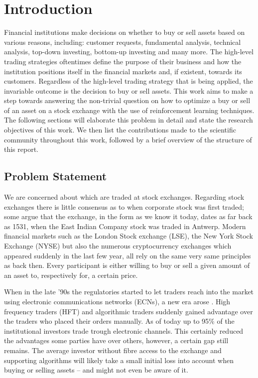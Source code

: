 \chapter{Introduction}

Financial institutions make decisions on whether to buy or sell assets based on various reasons, including: customer requests, fundamental analysis\cite{fundamental-analysis}, technical analysis\cite{technical-analysis}, top-down investing\cite{td-investing}, bottom-up investing\cite{bu-investing} and many more. 
The high-level trading strategies oftentimes define the purpose of their business and how the institution positions itself in the financial markets and, if existent, towards its customers. 
Regardless of the high-level trading strategy that is being applied, the invariable outcome is the decision to buy or sell assets.
This work aims to make a step towards answering the non-trivial question on how to optimize a buy or sell of an asset on a stock exchange with the use of reinforcement learning techniques.
The following sections will elaborate this problem in detail and state the research objectives of this work. 
We then list the contributions made to the scientific community throughout this work, followed by a brief overview of the structure of this report.

\section{Problem Statement}

We are concerned about which are traded at stock exchanges.
Regarding stock exchanges there is little consensus as to when corporate stock was first traded; some argue that the exchange, in the form as we know it today, dates as far back as 1531, when the East Indian Company stock was traded in Antwerp\cite{stock-exchange}.
Modern financial markets such as the London Stock exchange (LSE), the New York Stock Exchange (NYSE) but also the numerous cryptocurrency exchanges which appeared suddenly in the last few year, all rely on the same very same principles as back then.
Every participant is either willing to buy or sell a given amount of an asset to, respectively for, a certain price.

When in the late '90s the regulatories started to let traders reach into the market using electronic communications networks (ECNs), a new era arose \cite{dark-pools}.
High frequency traders (HFT) and algorithmic traders suddenly gained advantage over the traders who placed their orders manually.
As of today up to 95\% of the institutional investors trade trough electronic channels\cite{ecn}.
This certainly reduced the advantages some parties have over others, however, a certain gap still remains.
The average investor without fibre access to the exchange and supporting algorithms will likely take a small initial loss into account when buying or selling assets -- and might not even be aware of it.

